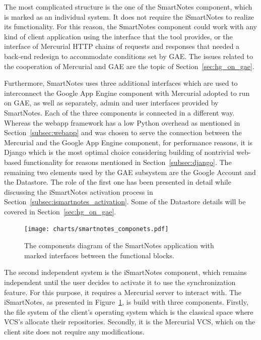 The most complicated structure is the one of the SmartNotes component, which is marked as an individual system. It does not require the iSmartNotes to realize its functionality. For this reason, the SmartNotes component could work with any kind of client application using the interface that the tool provides, or the interface of Mercurial HTTP chains of requests and responses that needed a back-end redesign to accommodate conditions set by GAE. The issues related to the cooperation of Mercurial and GAE are the topic of Section~\ref{sec:hg_on_gae}.
 
Furthermore, SmartNotes uses three additional interfaces which are used to interconnect the Google App Engine component with Mercurial adopted to run on GAE, as well as separately, admin and user interfaces provided by SmartNotes. Each of the three components is connected in a different way. Whereas the webapp framework has a low Python overhead as mentioned in Section~\ref{subsec:webapp} and was chosen to serve the connection between the Mercurial and the Google App Engine component, for performance reasons, it is Django which is the most optimal choice considering building of nontrivial web-based functionality for reasons mentioned in Section~\ref{subsec:django}. The remaining two elements used by the GAE subsystem are the Google Account and the Datastore. The role of the first one has been presented in detail while discussing the iSmartNotes activation process in Section~\ref{subsec:ismartnotes_activation}. Some of the Datastore details will be covered in Section~\ref{sec:hg_on_gae}.
\begin{figure}[ht]
\begin{center}
\texttt{[image: charts/smartnotes\_componets.pdf]}
\caption{The components diagram of the SmartNotes application with marked interfaces between the functional blocks.}
\label{fig:smartnotes_components}
\end{center}
\end{figure}
 
The second independent system is the iSmartNotes component, which remains independent until the user decides to activate it to use the synchronization feature. For this purpose, it requires a Mercurial server to interact with. The iSmartNotes, as presented in Figure~\ref{fig:smartnotes_components}, is build with three components. Firstly, the file system of the client's operating system which is the classical space where VCS's allocate their repositories. Secondly, it is the Mercurial VCS, which on the client site does not require any modifications. %
 
